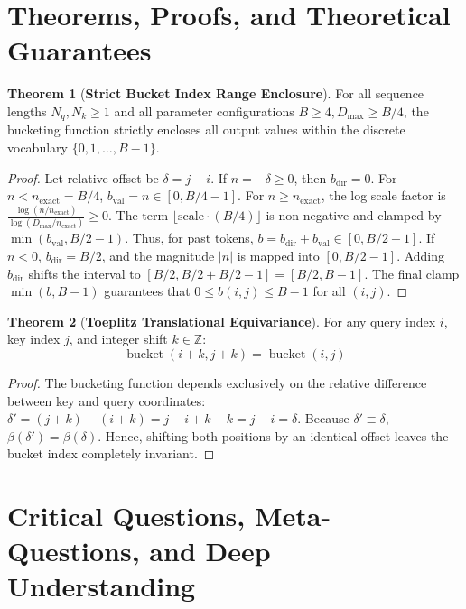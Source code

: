 \documentclass[11pt,a4paper]{article}
\theoremstyle{definition}
\newtheorem{theorem}{\textbf{Theorem}}[section]
\begin{document}
\section{Theorems, Proofs, and Theoretical Guarantees}

\begin{theorem}[\textbf{Strict Bucket Index Range Enclosure}]
For all sequence lengths $N_q, N_k \ge 1$ and all parameter configurations $B \ge 4, D_{\text{max}} \ge B/4$, the bucketing function strictly encloses all output values within the discrete vocabulary $\{0, 1, \dots, B - 1\}$.
\end{theorem}

\begin{proof}
Let relative offset be $\delta = j - i$.
If $n = -\delta \ge 0$, then $b_{\text{dir}} = 0$.
For $n < n_{\text{exact}} = B/4$, $b_{\text{val}} = n \in [0, B/4 - 1]$.
For $n \ge n_{\text{exact}}$, the log scale factor is $\frac{\log(n / n_{\text{exact}})}{\log(D_{\text{max}} / n_{\text{exact}})} \ge 0$.
The term $\lfloor \text{scale} \cdot (B/4) \rfloor$ is non-negative and clamped by $\min(b_{\text{val}}, B/2 - 1)$.
Thus, for past tokens, $b = b_{\text{dir}} + b_{\text{val}} \in [0, B/2 - 1]$.
If $n < 0$, $b_{\text{dir}} = B/2$, and the magnitude $|n|$ is mapped into $[0, B/2 - 1]$.
Adding $b_{\text{dir}}$ shifts the interval to $[B/2, B/2 + B/2 - 1] = [B/2, B - 1]$.
The final clamp $\min(b, B - 1)$ guarantees that $0 \le b(i, j) \le B - 1$ for all $(i, j)$.
\end{proof}

\begin{theorem}[\textbf{Toeplitz Translational Equivariance}]
For any query index $i$, key index $j$, and integer shift $k \in \mathbb{Z}$:
{\boldmath
\begin{equation}
\operatorname{bucket}(i + k, j + k) = \operatorname{bucket}(i, j)
\end{equation}
}
\end{theorem}

\begin{proof}
The bucketing function depends exclusively on the relative difference between key and query coordinates:
$\delta' = (j + k) - (i + k) = j - i + k - k = j - i = \delta$.
Because $\delta' \equiv \delta$, $\beta(\delta') = \beta(\delta)$.
Hence, shifting both positions by an identical offset leaves the bucket index completely invariant.
\end{proof}

\section{Critical Questions, Meta-Questions, and Deep Understanding}
\end{document}
